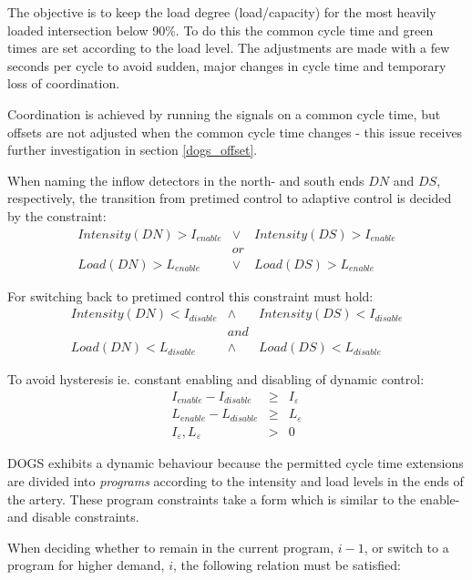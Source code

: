 The objective is to keep the load degree (load/capacity) for the most heavily loaded intersection below 90\%.
To do this the common cycle time and green times are set according to the load level. The adjustments are made with a few seconds per cycle to avoid sudden, major changes in cycle time and temporary loss of coordination.

Coordination is achieved by running the signals on a common cycle time, but offsets are not adjusted when the common cycle time changes - this issue receives further investigation in section \ref{dogs_offset}.

When naming the inflow detectors in the north- and south ends $DN$ and $DS$, respectively, the transition from pretimed control to adaptive control is decided by the constraint:
\begin{eqnarray*}
Intensity(DN) > I_{enable} & \vee & Intensity(DS) > I_{enable} \\
& or & \\
Load(DN) > L_{enable} & \vee & Load(DS) > L_{enable}
\end{eqnarray*}

For switching back to pretimed control this constraint must hold:
\begin{eqnarray*}
Intensity(DN) < I_{disable} & \wedge & Intensity(DS) < I_{disable} \\
& and & \\
Load(DN) < L_{disable} & \wedge & Load(DS) < L_{disable}
\end{eqnarray*}

To avoid hysteresis ie. constant enabling and disabling of dynamic control:
\begin{eqnarray}
I_{enable} - I_{disable} & \geq & I_{\varepsilon} \label{eqn:hysteresis_intensity} \\ 
L_{enable} - L_{disable} & \geq & L_{\varepsilon} \label{eqn:hysteresis_load} \\
I_{\varepsilon},L_{\varepsilon} & > & 0 \label{eqn:hysteresis_limits}
\label{eqn:hysteresis}
\end{eqnarray}

DOGS exhibits a dynamic behaviour because the permitted cycle time extensions are divided into \textit{programs} according to the intensity and load levels in the ends of the artery. These program constraints take a form which is similar to the enable- and disable constraints.

When deciding whether to remain in the current program, $i-1$, or switch to a program for higher demand, $i$, the following relation must be satisfied:

